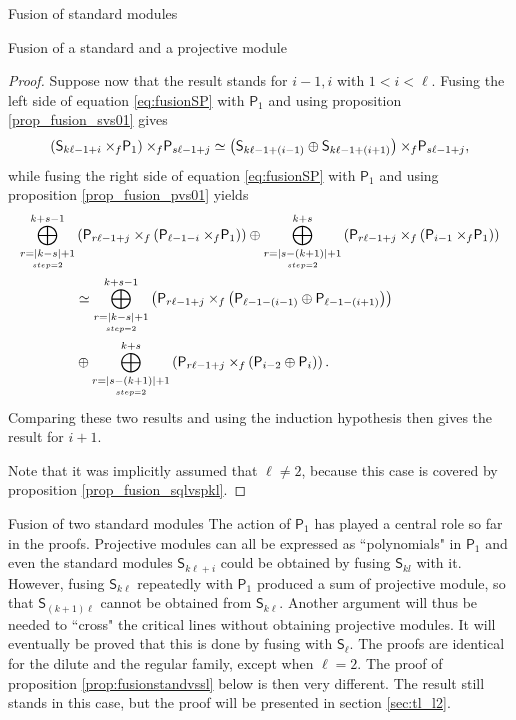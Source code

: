 \documentclass[reqno]{amsart}
\newcommand{\ds}[1]{\mathsf S_{#1}}
\newcommand{\dP}[1]{\mathsf P_{#1}}
\newcommand{\xf}{\times\hspace{-0.27em}_f}
\newcommand{\lc}{\ell}
\begin{document}
\begin{section}{Fusion of standard modules}
\begin{subsection}{Fusion of a standard and a projective module}
\begin{proof}
Suppose now that the result stands for $i-1,i$ with $1<i<\lc$. Fusing the left side of equation \eqref{eq:fusionSP} with $\dP{1}$ and using proposition \ref{prop_fusion_svs01} gives
\begin{equation}
\left( \ds{k \lc -1 +i} \xf \dP{1} \right) \xf \dP{s \lc -1+j} \simeq \left( \ds{k \lc -1 +(i-1)} \oplus \ds{k \lc -1 +(i+1)}  \right) \xf \dP{s \lc -1+j},
\end{equation}
while fusing the right side of equation \eqref{eq:fusionSP} with $\dP{1}$ and using proposition \ref{prop_fusion_pvs01} yields
\begin{align}
\overset{k+s-1}{\underset{\underset{step =2}{r = |k-s| + 1}}{\bigoplus}}&\left( \dP{r \lc -1+j} \xf \left(\dP{\lc -1-i}\xf \dP{1}\right)\right) \oplus \overset{k+s}{\underset{\underset{step =2}{r = |s-(k+1)| + 1}}{\bigoplus}} \left(\dP{r \lc -1+j} \xf \left(\dP{i-1} \xf \dP{1}\right) \right) \notag \\
& \simeq \overset{k+s-1}{\underset{\underset{step =2}{r = |k-s| + 1}}{\bigoplus}}\left( \dP{r \lc -1+j} \xf \left(\dP{\lc -1-(i-1)}\oplus \dP{\lc -1-(i+1)}\right)\right) \notag \\
& \oplus \overset{k+s}{\underset{\underset{step =2}{r = |s-(k+1)| + 1}}{\bigoplus}} \left(\dP{r \lc -1+j} \xf \left(\dP{i-2} \oplus \dP{i}\right) \right).
\end{align}
Comparing these two results and using the induction hypothesis then gives the result for $i+1$. 

Note that it was implicitly assumed that $\lc \neq 2$, because this case is covered by proposition \ref{prop_fusion_sqlvspkl}.
\end{proof}
\end{subsection}
\begin{subsection}{Fusion of two standard modules}
The action of $\dP{1}$ has played a central role so far in the proofs. Projective modules can all be expressed as ``polynomials" in $\dP{1}$ and even the standard modules $\ds{k \lc +i}$ could be obtained by fusing $\ds{k l}$ with it. However, fusing $\ds{k \lc}$ repeatedly with $\dP{1}$ produced a sum of projective module, so that $\ds{(k+1)\lc}$ cannot be obtained from $\ds{k \lc}$. Another argument will thus be needed to ``cross" the critical lines without obtaining projective modules. It will eventually be proved that this is done by fusing with $\ds{\lc}$. The proofs are identical for the dilute and the regular family, except when $\lc =2$. The proof of proposition \ref{prop:fusionstandvssl} below is then very different. The result still stands in this case, but the proof will be presented in section \ref{sec:tl_l2}.


\end{subsection}
\end{section}
\end{document}
